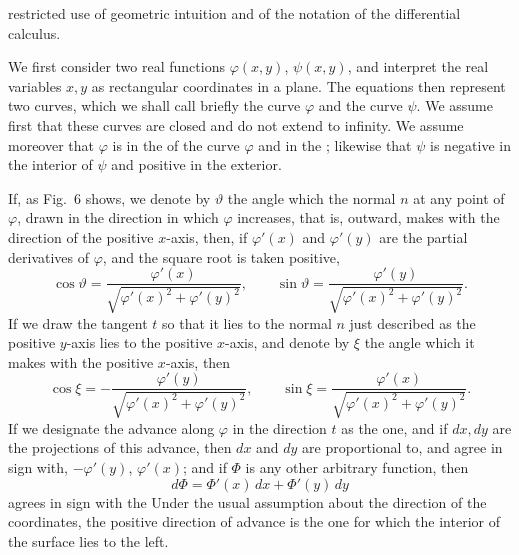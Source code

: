 
restricted use of geometric intuition and of the notation of the differential calculus.

We first consider two real functions $\varphi(x,y)$, $\psi(x,y)$, and interpret the real variables $x, y$ as rectangular coordinates in a plane. The equations
then represent two curves, which we shall call briefly the curve $\varphi$ and the curve $\psi$. We assume first that these curves are closed and do not extend to infinity. We assume moreover that $\varphi$ is  in the  of the curve $\varphi$ and  in the ; likewise that $\psi$ is negative in the interior of $\psi$ and positive in the exterior.

If, as Fig.\ 6 shows, we denote by $\vartheta$ the angle which the normal $n$ at any point of $\varphi$, drawn in the direction in which $\varphi$ increases, that is, outward, makes with the direction of the positive $x$-axis, then, if $\varphi'(x)$ and $\varphi'(y)$ are the partial derivatives of $\varphi$, and the square root is taken positive,
\[
\cos\vartheta = \frac{\varphi'(x)}{\sqrt{\varphi'(x)^2 + \varphi'(y)^2}},\qquad \sin\vartheta = \frac{\varphi'(y)}{\sqrt{\varphi'(x)^2 + \varphi'(y)^2}}.
\]
If we draw the tangent $t$ so that it lies to the normal $n$ just described as the positive $y$-axis lies to the positive $x$-axis, and denote by $\xi$ the angle which it makes with the positive $x$-axis, then
\[
\cos\xi = -\frac{\varphi'(y)}{\sqrt{\varphi'(x)^2 + \varphi'(y)^2}},\qquad \sin\xi = \frac{\varphi'(x)}{\sqrt{\varphi'(x)^2 + \varphi'(y)^2}}.
\]
If we designate the advance along $\varphi$ in the direction $t$ as the  one, and if $dx, dy$ are the projections of this advance, then $dx$ and $dy$ are proportional to, and agree in sign with, $-\varphi'(y)$, $\varphi'(x)$; and if $\Phi$ is any other arbitrary function, then
\[
d\Phi = \Phi'(x)\,dx + \Phi'(y)\,dy
\]
agrees in sign with the 
Under the usual assumption about the direction of the coordinates, the positive direction of advance is the one for which the interior of the surface lies to the left.
